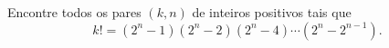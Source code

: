 Encontre todos os pares $(k, n)$ de inteiros positivos tais que
$$k! = (2^n - 1)(2^n - 2)(2^n - 4)\cdots(2^n-2^{n-1}).$$